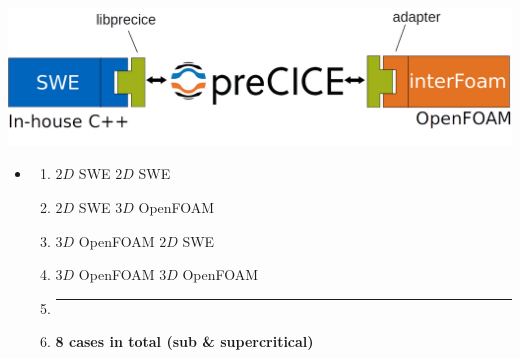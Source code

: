 \begin{frame}
\begin{minipage}{0.45\textwidth}
\centering
 \includegraphics[width=1\textwidth]{Resources/Images/pash2.png}
\end{minipage}
\hspace{1cm}
\begin{minipage}{0.42\textwidth}
\begin{itemize}
\item<2->[]
\begin{tcolorbox}[coltitle=white,title= \textbf{Domain-mapping cases},colframe=black, colback=white] 
\vspace{0.5cm}
\begin{enumerate}
\setlength{\itemsep}{1cm}
\item $2D$ SWE    $2D$ SWE 
\item {$2D$ SWE    $3D$ OpenFOAM}   
\item {$3D$ OpenFOAM     $2D$ SWE}
\item $3D$ OpenFOAM     $3D$ OpenFOAM
\setlength{\itemsep}{0.05cm}
\item[] \par\noindent\rule{0.85\textwidth}{2pt} 
\item[] \quad  \textbf{8 cases in total \quad \footnotesize{(sub \& supercritical)}}
\end{enumerate}
\end{tcolorbox}
\end{itemize}
\end{minipage}
\end{frame}





